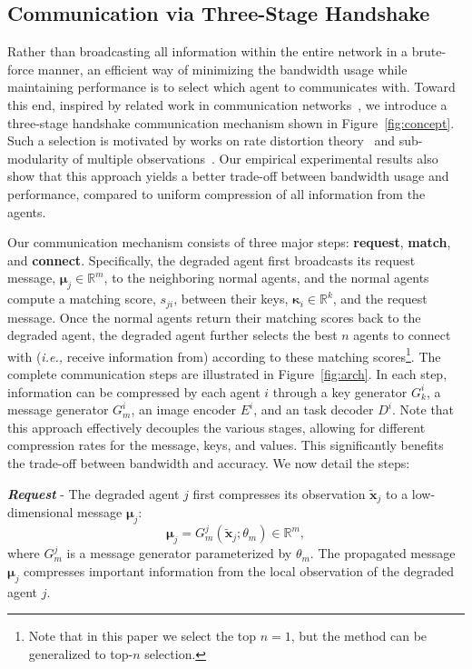 \subsection{Communication via Three-Stage Handshake}
Rather than broadcasting all information within the entire network in a brute-force manner, an efficient way of minimizing the bandwidth usage while  maintaining performance is to select which agent to communicates with. Toward this end, inspired by related work in communication networks~\cite{kurose2005computer}, we introduce a three-stage handshake communication mechanism 
shown in Figure~\ref{fig:concept}. Such a selection is motivated by works on rate distortion theory~\cite{dobbe2017fully} and sub-modularity of multiple observations~\cite{krause2007near}. Our empirical experimental results also show that this approach yields a better trade-off between bandwidth usage and performance, compared to uniform compression of all information from the agents.


Our communication mechanism consists of three major steps: \textbf{request}, \textbf{match}, and \textbf{connect}. Specifically, the degraded agent first broadcasts its request message, $\bm{\mu}_j \in\mathbb{R}^m$, to the neighboring normal agents, and the normal agents compute a matching score, $s_{ji}$, between their keys, $\bm{\kappa}_i \in\mathbb{R}^k$, and the request message. 
Once the normal agents return their matching scores back to the degraded agent, the degraded agent further selects the best $n$ agents to connect with (\textit{i.e.,} receive information from) according to these matching scores\footnote{Note that in this paper we select the top $n=1$, but the method can be generalized to top-$n$ selection.}. 
The complete communication steps are illustrated in Figure~\ref{fig:arch}.
In each step, information can be compressed by each agent $i$ through a key generator $G^i_k$, a message generator  $G^i_m$, an image encoder $E^i$, and an task decoder $D^i$. 
Note that this approach effectively decouples the various stages, allowing for different compression rates for the message, keys, and values. This significantly benefits the trade-off between bandwidth and accuracy. We now detail the steps: 

\textit{\textbf{Request}} - 
The degraded agent $j$ first compresses its observation $\tilde{\bm{x}}_j$ to a low-dimensional message $\bm{\mu}_j$:
\begin{equation}
     \bm{\mu}_j = G^j_m(\tilde{\bm{x}}_j; \theta_m)\in\mathbb{R}^m,
\end{equation}
where $G^j_m$ is a message generator parameterized by $\theta_m$. The propagated message $\bm{\mu}_j$ compresses important information from the local observation of the degraded agent $j$.

